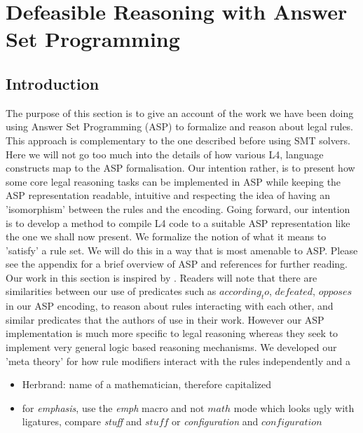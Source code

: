 \section{Defeasible Reasoning with Answer Set Programming}\label{sec:defeasible_asp}



\subsection{Introduction}
The purpose of this section is to give an account of the work we have been doing using Answer Set Programming (ASP) to formalize and reason about legal rules. This approach is complementary to the one described before using SMT solvers. Here we will not go too much into the details of how various L4, language constructs map to the ASP formalisation. Our intention rather, is to present how some core legal reasoning tasks can be implemented in ASP while keeping the ASP representation readable, intuitive and respecting the idea of having an 'isomorphism' between the rules and the encoding. Going forward, our intention is to develop a method to compile L4 code to a suitable ASP representation like the one we shall now present. We formalize the notion of what it means to 'satisfy' a rule set. We will do this in a way that is most amenable to ASP. Please see the appendix for a brief overview of ASP and references for further reading.\\

Our work in this section is inspired by \cite{DBLP:conf/iclp/WanGKFL09}. Readers will note that there are similarities between our use of predicates such as $according_to$, $defeated$, $opposes$ in our ASP encoding, to reason about rules interacting with each other, and similar predicates that the authors of \cite{DBLP:conf/iclp/WanGKFL09} use in their work. However our ASP implementation is much more specific to legal reasoning whereas they seek to implement very general logic based reasoning mechanisms. We developed our 'meta theory' for how rule modifiers interact with the rules independently and a  

   

\begin{itemize}
    \item Herbrand: name of a mathematician, therefore capitalized
    \item for \emph{emphasis}, use the \emph{emph} macro and not $math$ mode which looks ugly with ligatures, compare \emph{stuff} and $stuff$ or \emph{configuration} and $configuration$
\end{itemize}



